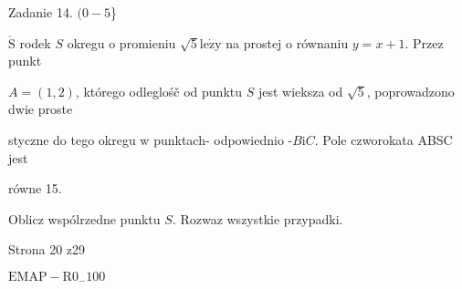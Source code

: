 \documentclass[a4paper,12pt]{article}
\begin{document}
Zadanie 14. $(0-5$\}

$\acute{\mathrm{S}}$ rodek $S$ okregu o promieniu $\sqrt{5} \mathrm{l}\mathrm{e}\dot{\mathrm{z}}\mathrm{y}$ na prostej o równaniu $y=x+1$. Przez punkt

$A=(1,2)$, którego odleglośč od punktu $S$ jest wieksza od $\sqrt{5}$, poprowadzono dwie proste

styczne do tego okregu w punktach- odpowiednio -$B \mathrm{i} C$. Pole czworokata ABSC jest

równe 15.

Oblicz wspólrzedne punktu $S$. Rozwaz wszystkie przypadki.

Strona 20 z29

$\mathrm{E}\mathrm{M}\mathrm{A}\mathrm{P}-\mathrm{R}0_{-}100$
\end{document}

